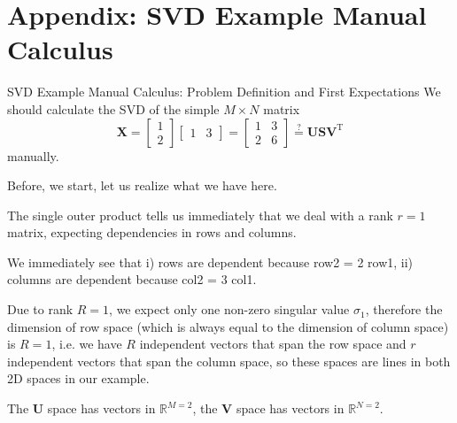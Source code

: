 \documentclass[mathserif, aspectratio=1610]{intbeamer}
\begin{document}




\section{Appendix: SVD Example Manual Calculus}
\begin{frame}[t]{SVD Example Manual Calculus: Problem Definition and First Expectations}
We should calculate the SVD of the simple $M \times N$ matrix
$$\bm{X} =
\begin{bmatrix}
1\\2
\end{bmatrix}
\begin{bmatrix}
1 & 3
\end{bmatrix}
=
\begin{bmatrix}
1 & 3\\
2 & 6
\end{bmatrix}
\stackrel{?}{=}
\bm{U}\bm{S}\bm{V}^\mathrm{T}
$$
manually.

Before, we start, let us realize what we have here.

The single outer product tells us immediately that we deal with a rank $r=1$ matrix, expecting dependencies
in rows and columns.

We immediately see that i) rows are dependent because row2 = 2 row1, ii) columns are dependent because col2 = 3 col1.

Due to rank $R=1$, we expect only one non-zero singular value $\sigma_1$, therefore the dimension
of row space (which is always equal to the dimension of column space) is $R=1$, i.e. we have $R$
independent vectors that span the row space and $r$ independent vectors that span the column space, so these spaces are lines in both 2D spaces in our example.

The $\bm{U}$ space has vectors in $\mathbb{R}^{M=2}$, the $\bm{V}$ space has vectors in $\mathbb{R}^{N=2}$.

\end{frame}
\end{document}
